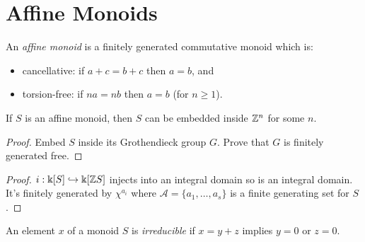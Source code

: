 \section{Affine Monoids}


\begin{definition}
  \label{0-aff-mon}
  \leanok

  An \emph{affine monoid} is a finitely generated commutative monoid which is:
  \begin{itemize}
    \item cancellative: if $a + c = b + c$ then $a = b$, and
    \item torsion-free: if $n a = n b$ then $a = b$ (for $n \geq 1$).
  \end{itemize}
\end{definition}


\begin{proposition}
  \label{0-embed-aff-mon}

  If $S$ is an affine monoid, then $S$ can be embedded inside ${\mathbb Z}^n$ for some $n$.
\end{proposition}
\begin{proof}
  \uses{}

  Embed $S$ inside its Grothendieck group $G$. Prove that $G$ is finitely generated free.
\end{proof}


\begin{proof}

  $i : \Bbbk[S] \hookrightarrow \Bbbk[{\mathbb Z} S]$ injects into an integral domain so is an integral domain. It's finitely generated by $\chi^{a_i}$ where $\mathcal A = \{a_1, \dotsc, a_s\}$ is a finite generating set for $S$.
\end{proof}


\begin{definition}
  \label{0-irred}
  \uses{}

  An element $x$ of a monoid $S$ is \emph{irreducible} if $x = y + z$ implies $y = 0$ or $z = 0$.
\end{definition}


